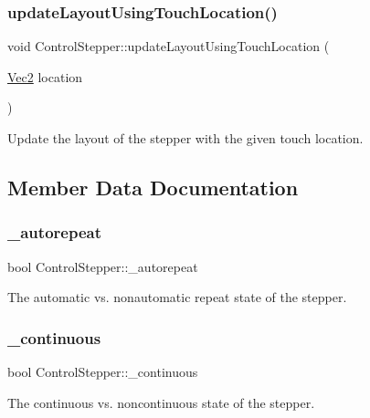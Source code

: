 \subsubsection{\texorpdfstring{update\+Layout\+Using\+Touch\+Location()}{updateLayoutUsingTouchLocation()}\hspace{0.1cm}{\footnotesize\ttfamily [2/2]}}
{\footnotesize\ttfamily void Control\+Stepper\+::update\+Layout\+Using\+Touch\+Location (\begin{DoxyParamCaption}\item[{\hyperlink{classVec2}{Vec2}}]{location }\end{DoxyParamCaption})}

Update the layout of the stepper with the given touch location. 

\subsection{Member Data Documentation}
\mbox{\label{classControlStepper_ac0170ab1141a829cade54f76fe71a2cf}} 
\subsubsection{\texorpdfstring{\+\_\+autorepeat}{\_autorepeat}}
{\footnotesize\ttfamily bool Control\+Stepper\+::\+\_\+autorepeat\hspace{0.3cm}{\ttfamily [protected]}}

The automatic vs. nonautomatic repeat state of the stepper. \mbox{\label{classControlStepper_a719913d4a3b9a5547c667ea59acce5e1}} 
\subsubsection{\texorpdfstring{\+\_\+continuous}{\_continuous}}
{\footnotesize\ttfamily bool Control\+Stepper\+::\+\_\+continuous\hspace{0.3cm}{\ttfamily [protected]}}

The continuous vs. noncontinuous state of the stepper. \mbox{\label{classControlStepper_a3032c6b015481de0651f425d67a0c920}} 
